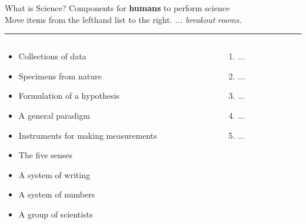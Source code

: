 \documentclass{beamer}
\begin{document}
\begin{frame}{What is Science?}
\small
Components for \textbf{humans} to perform science \\ Move items from the lefthand list to the right. \textit{... breakout rooms.}
\rule{10cm}{0.05cm}
\begin{columns}
\begin{column}{0.65\textwidth}
\begin{itemize}
\item Collections of data
\item Specimens from nature
\item Formulation of a hypothesis
\item A general paradigm
\item Instruments for making measurements
\item The five senses
\item A system of writing
\item A system of numbers
\item A group of scientists
\end{itemize}
\end{column}
\begin{column}{0.35\textwidth}
\begin{enumerate}
\item ...
\item ...
\item ...
\item ...
\item ...
\end{enumerate}
\end{column}
\end{columns}
\end{frame}
\end{document}
